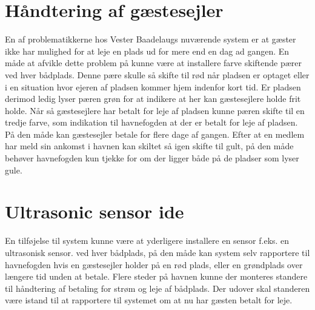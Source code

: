 
\section{Håndtering af gæstesejler}
\label{sub:h_ndtering_af_g_stesejler}
En af problematikkerne hos Vester Baadelaugs nuværende system er at gæster ikke har mulighed for at leje en plads ud for mere end en dag ad gangen. 
En måde at afvikle dette problem på kunne være at installere farve skiftende pærer ved hver bådplads. Denne pære skulle så skifte til rød når pladsen er optaget eller i en situation hvor ejeren af pladsen kommer hjem indenfor kort tid. Er pladsen derimod ledig lyser pæren grøn for at indikere at her kan gæstesejlere holde frit holde. 
Når så gæstesejlere har betalt for leje af pladsen kunne pæren skifte til en tredje farve, som indikation til havnefogden at der er betalt for leje af pladsen. På den måde kan gæstesejler betale for flere dage af gangen. Efter at en medlem har meld sin ankomst i havnen kan skiltet så igen skifte til gult, på den måde behøver havnefogden kun tjekke for om der ligger både på de pladser som lyser gule. 


\section{Ultrasonic sensor ide} %
\label{sec:Ultrasonic sensor ide}

En tilføjelse til system kunne være at yderligere installere en sensor f.eks. en ultrasonisk sensor. ved hver bådplads, på den måde kan system selv rapportere til havnefogden hvis en gæstesejler holder på en rød plads, eller en grøndplads over længere tid unden at betale.
Flere steder på havnen kunne der monteres standere til håndtering af betaling for strøm og leje af bådplads. Der udover skal standeren være istand til at rapportere til systemet om at nu har gæsten betalt for leje.

